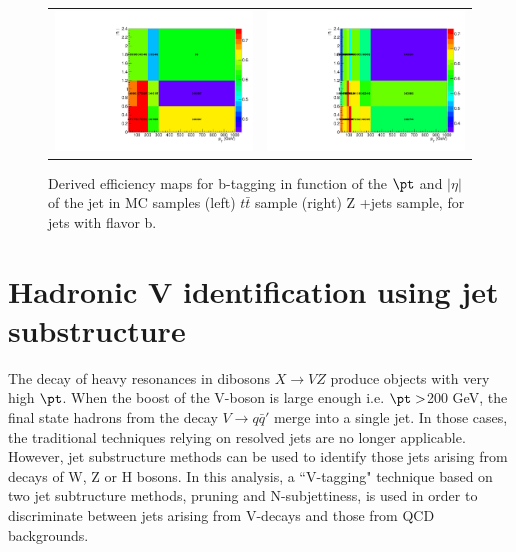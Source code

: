 \begin{figure}[!ht]
\caption{Derived efficiency maps for b-tagging in function of the $\pt$ and $\left|\eta\right|$ of the jet in MC samples (left) $t\bar{t}$ sample  (right) Z +jets sample, for jets with flavor b.}
\begin{tabular}{cc}
  \includegraphics[width=200pt]{figures/SFbtagg/effmapTT.pdf} &
  \includegraphics[width=200pt]{figures/SFbtagg/effmapZJ.pdf}\\
\end{tabular}
\label{fig:bjetsscalefactor}
\end{figure}


\section{Hadronic V identification using jet substructure}
\label{sec:HadronicVid}

\par The decay of heavy resonances in dibosons $X \rightarrow VZ$ produce objects with very high $\pt$. When the boost of the V-boson is large enough i.e. $\pt>$200 GeV, the final state hadrons from the decay $V \rightarrow q\bar{q}'$  merge into a single jet. In those cases, the traditional techniques relying on resolved jets are no longer applicable. However, jet substructure methods can be used to identify those jets arising from decays of W, Z or H bosons.
In this analysis, a ``V-tagging" technique based on two jet subtructure methods, pruning  and N-subjettiness, is used in order to discriminate between jets arising from V-decays and those from QCD backgrounds.

